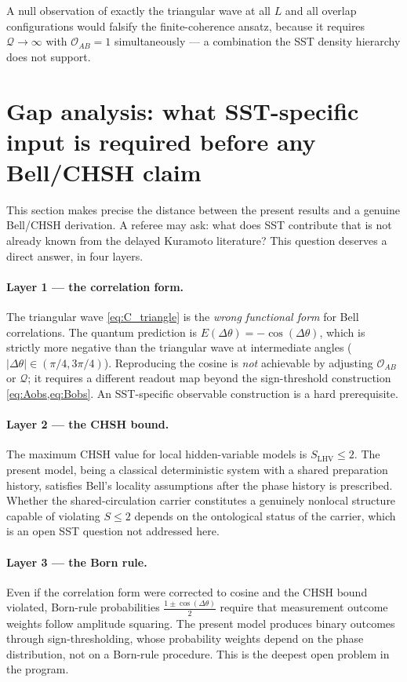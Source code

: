 \documentclass[11pt]{article}
\begin{document}
A null observation of exactly the triangular wave at all $L$ and all overlap configurations would falsify the finite-coherence ansatz, because it requires $\mathcal{Q} \to \infty$ with $\mathcal{O}_{AB} = 1$ simultaneously — a combination the SST density hierarchy does not support.

\section{Gap analysis: what SST-specific input is required before any Bell/CHSH claim}
\label{sec:gap}

This section makes precise the distance between the present results and a genuine Bell/CHSH derivation. A referee may ask: what does SST contribute that is not already known from the delayed Kuramoto literature? This question deserves a direct answer, in four layers.

\paragraph{Layer 1 — the correlation form.}
The triangular wave \cref{eq:C_triangle} is the \emph{wrong functional form} for Bell correlations. The quantum prediction is $E(\Delta\theta) = -\cos(\Delta\theta)$, which is strictly more negative than the triangular wave at intermediate angles ($|\Delta\theta| \in (\pi/4, 3\pi/4)$). Reproducing the cosine is \emph{not} achievable by adjusting $\mathcal{O}_{AB}$ or $\mathcal{Q}$; it requires a different readout map beyond the sign-threshold construction \cref{eq:Aobs,eq:Bobs}. An SST-specific observable construction is a hard prerequisite.

\paragraph{Layer 2 — the CHSH bound.}
The maximum CHSH value for local hidden-variable models is $S_{\mathrm{LHV}} \le 2$. The present model, being a classical deterministic system with a shared preparation history, satisfies Bell's locality assumptions after the phase history is prescribed. Whether the shared-circulation carrier constitutes a genuinely nonlocal structure capable of violating $S \le 2$ depends on the ontological status of the carrier, which is an open SST question not addressed here.

\paragraph{Layer 3 — the Born rule.}
Even if the correlation form were corrected to cosine and the CHSH bound violated, Born-rule probabilities $\frac{1 \pm \cos(\Delta\theta)}{2}$ require that measurement outcome weights follow amplitude squaring. The present model produces binary outcomes through sign-thresholding, whose probability weights depend on the phase distribution, not on a Born-rule procedure. This is the deepest open problem in the program.
\end{document}
